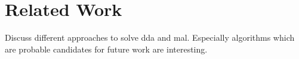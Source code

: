 \section{Related Work}\label{s:work}
Discuss different approaches to solve \ac{dda} and \ac{mal}. Especially algorithms which are probable candidates for future work are interesting.